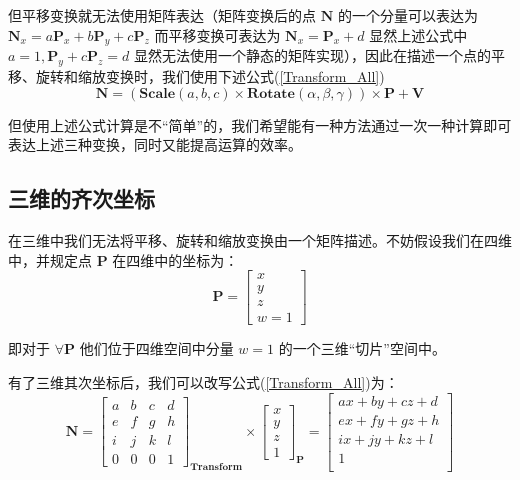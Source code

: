 \documentclass[12pt,oneside,a4paper]{ctexart}
\begin{document}
但平移变换就无法使用矩阵表达（矩阵变换后的点 $\mathbf{N}$ 的一个分量可以表达为 $\mathbf{N}_x=a\mathbf{P}_x+b\mathbf{P}_y+c\mathbf{P}_z$ 而平移变换可表达为 $\mathbf{N}_x=\mathbf{P}_x+d$ 显然上述公式中 $a=1, \mathbf{P}_y+c\mathbf{P}_z=d$ 显然无法使用一个静态的矩阵实现），因此在描述一个点的平移、旋转和缩放变换时，我们使用下述公式(\ref{Transform_All})
\begin{equation}
	\mathbf{N}=
	(
	\mathbf{Scale}(a,b,c)
	\times
	\mathbf{Rotate}(\alpha,\beta,\gamma)
	)\times
	\mathbf{P}
	+
	\mathbf{V}
	\label{Transform_All}
\end{equation}

但使用上述公式计算是不“简单”的，我们希望能有一种方法通过一次一种计算即可表达上述三种变换，同时又能提高运算的效率。
\subsection{三维的齐次坐标}
在三维中我们无法将平移、旋转和缩放变换由一个矩阵描述。不妨假设我们在四维中，并规定点 $\mathbf{P}$ 在四维中的坐标为：
\begin{equation*}
	\mathbf{P}=
	\begin{bmatrix}
		x \\
		y \\
		z \\
		w=1
	\end{bmatrix}
\end{equation*}

即对于 $\forall{}\mathbf{P}$ 他们位于四维空间中分量 $w=1$ 的一个三维“切片”空间中。

有了三维其次坐标后，我们可以改写公式(\ref{Transform_All})为：
\begin{equation}
	\mathbf{N} =
	\begin{bmatrix}
		a & b & c & d \\
		e & f & g & h \\
		i & j & k & l \\
		0 & 0 & 0 & 1
	\end{bmatrix}_{\mathbf{Transform}}
	\times
	\begin{bmatrix}
		x \\
		y \\
		z \\
		1
	\end{bmatrix}_{\mathbf{P}}
	=
	\begin{bmatrix}
		ax+by+cz+d \\
		ex+fy+gz+h \\
		ix+jy+kz+l \\
		1          \\
	\end{bmatrix}
	\label{Transform_All_New}
\end{equation}
\end{document}
